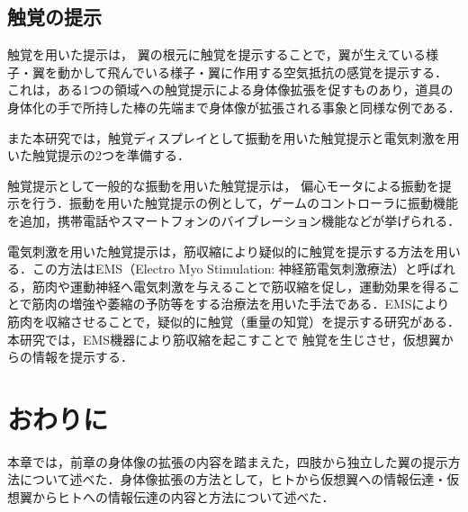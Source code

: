 
    
    \subsection{触覚の提示}

        触覚を用いた提示は，
        翼の根元に触覚を提示することで，翼が生えている様子・翼を動かして飛んでいる様子・翼に作用する空気抵抗の感覚を提示する．
        これは，ある1つの領域への触覚提示による身体像拡張を促すものあり，道具の身体化の手で所持した棒の先端まで身体像が拡張される事象と同様な例である．
        
        また本研究では，触覚ディスプレイとして振動を用いた触覚提示と電気刺激を用いた触覚提示の2つを準備する．
        
        触覚提示として一般的な振動を用いた触覚提示は，
        偏心モータによる振動を提示を行う．振動を用いた触覚提示の例として，ゲームのコントローラに振動機能を追加\cite{shim2020fs}，携帯電話やスマートフォンのバイブレーション機能などが挙げられる．

        電気刺激を用いた触覚提示は，筋収縮により疑似的に触覚を提示する方法を用いる．この方法はEMS（Electro Myo Stimulation: 神経筋電気刺激療法）と呼ばれる，筋肉や運動神経へ電気刺激を与えることで筋収縮を促し，運動効果を得ることで筋肉の増強や萎縮の予防等をする治療法を用いた手法である．EMSにより筋肉を収縮させることで，疑似的に触覚（重量の知覚）を提示する研究がある\cite{小川剛史2017電気的筋肉刺激が重量知覚に及ぼす影響の分析}．本研究では，EMS機器により筋収縮を起こすことで
        触覚を生じさせ，仮想翼からの情報を提示する．

\section{おわりに}
    本章では，前章の身体像の拡張の内容を踏まえた，四肢から独立した翼の提示方法について述べた．身体像拡張の方法として，ヒトから仮想翼への情報伝達・仮想翼からヒトへの情報伝達の内容と方法について述べた．
